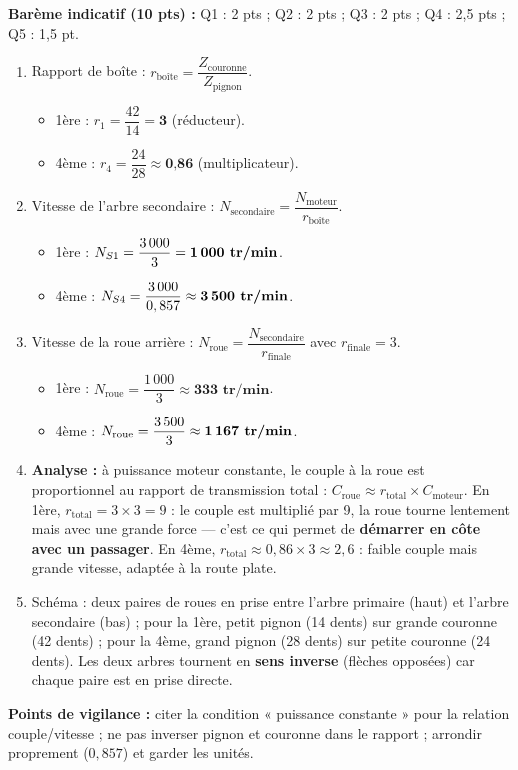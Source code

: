 \documentclass[11pt]{article}
\begin{document}
\begin{corrige}
\textbf{Barème indicatif (10 pts) :} Q1 : 2 pts ; Q2 : 2 pts ; Q3 : 2 pts ; Q4 : 2,5 pts ; Q5 : 1,5 pt.

\begin{enumerate}
    \item Rapport de boîte : $r_{\text{boîte}} = \dfrac{Z_{\text{couronne}}}{Z_{\text{pignon}}}$.
    \begin{itemize}
        \item 1ère : $r_1 = \dfrac{42}{14} = \textbf{3}$ (réducteur).
        \item 4ème : $r_4 = \dfrac{24}{28} \approx \textbf{0,86}$ (multiplicateur).
    \end{itemize}
    \item Vitesse de l'arbre secondaire : $N_{\text{secondaire}} = \dfrac{N_{\text{moteur}}}{r_{\text{boîte}}}$.
    \begin{itemize}
        \item 1ère : $N_{S1} = \dfrac{3\,000}{3} = \textbf{1\,000 tr/min}$.
        \item 4ème : $N_{S4} = \dfrac{3\,000}{0,857} \approx \textbf{3\,500 tr/min}$.
    \end{itemize}
    \item Vitesse de la roue arrière : $N_{\text{roue}} = \dfrac{N_{\text{secondaire}}}{r_{\text{finale}}}$ avec $r_{\text{finale}} = 3$.
    \begin{itemize}
        \item 1ère : $N_{\text{roue}} = \dfrac{1\,000}{3} \approx \textbf{333 tr/min}$.
        \item 4ème : $N_{\text{roue}} = \dfrac{3\,500}{3} \approx \textbf{1\,167 tr/min}$.
    \end{itemize}
    \item \textbf{Analyse :} à puissance moteur constante, le couple à la roue est proportionnel au rapport de transmission total : $C_{\text{roue}} \approx r_{\text{total}} \times C_{\text{moteur}}$. En 1ère, $r_{\text{total}} = 3 \times 3 = 9$ : le couple est multiplié par 9, la roue tourne lentement mais avec une grande force — c'est ce qui permet de \textbf{démarrer en côte avec un passager}. En 4ème, $r_{\text{total}} \approx 0,86 \times 3 \approx 2,6$ : faible couple mais grande vitesse, adaptée à la route plate.
    \item Schéma : deux paires de roues en prise entre l'arbre primaire (haut) et l'arbre secondaire (bas) ; pour la 1ère, petit pignon (14 dents) sur grande couronne (42 dents) ; pour la 4ème, grand pignon (28 dents) sur petite couronne (24 dents). Les deux arbres tournent en \textbf{sens inverse} (flèches opposées) car chaque paire est en prise directe.
\end{enumerate}
\textbf{Points de vigilance :} citer la condition « puissance constante » pour la relation couple/vitesse ; ne pas inverser pignon et couronne dans le rapport ; arrondir proprement ($0,857$) et garder les unités.
\end{corrige}
\end{document}
